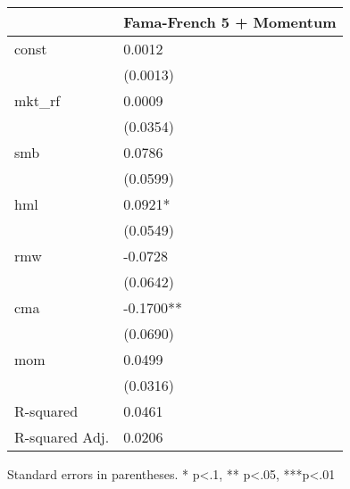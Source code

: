\begin{table}
\caption{}
\label{}
\begin{center}
\begin{tabular}{ll}
\hline
               & Fama-French 5 + Momentum  \\
\hline
const          & 0.0012                    \\
               & (0.0013)                  \\
mkt\_rf        & 0.0009                    \\
               & (0.0354)                  \\
smb            & 0.0786                    \\
               & (0.0599)                  \\
hml            & 0.0921*                   \\
               & (0.0549)                  \\
rmw            & -0.0728                   \\
               & (0.0642)                  \\
cma            & -0.1700**                 \\
               & (0.0690)                  \\
mom            & 0.0499                    \\
               & (0.0316)                  \\
R-squared      & 0.0461                    \\
R-squared Adj. & 0.0206                    \\
\hline
\end{tabular}
\end{center}
\end{table}
\bigskip
Standard errors in parentheses. \newline 
* p<.1, ** p<.05, ***p<.01
